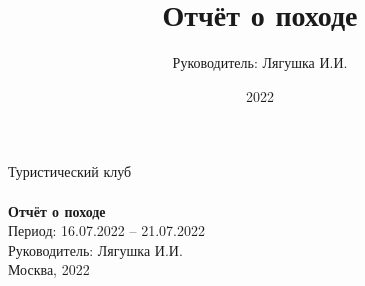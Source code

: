 \documentclass{tourreport}
\title{Отчёт о походе}
\author{Руководитель: Лягушка И.И.}
\date{2022}
\begin{document}
\begin{titlepage}
  \centering

  {\Large Туристический клуб}\\[1.5cm]
  \\[1cm]

  {\Huge\bfseries Отчёт о походе}\\[1cm]
  {\Large Период: 16.07.2022 -- 21.07.2022}\\[2cm]
  {\large Руководитель: Лягушка И.И.}\\[1cm]
  {\large Москва, 2022}
  \vfill
\end{titlepage}

\tableofcontents
\newpage

\setcounter{page}{5}









\appendix
% 



\end{document}
